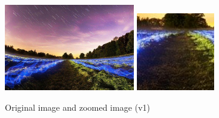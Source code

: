 \begin{figure}[h]
    \centering
    \includegraphics[width=0.5\textwidth]{img/start/sample640x426.jpg}
    \includegraphics[width=0.3\textwidth]{img/start/selectedZoneCutout.jpg}
    \caption{Original image and zoomed image (v1)}
    \label{fig:original}
\end{figure}